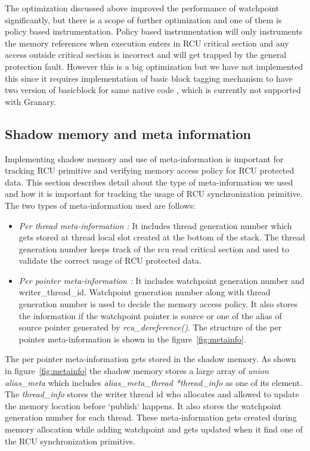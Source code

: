 The optimization discussed above improved the performance of watchpoint significantly, but there is a scope of further optimization and one of them is policy based instrumentation. Policy based instrumentation will only instruments the memory references when execution enters in RCU critical section and any access outside critical section is incorrect and will get trapped by the general protection fault. However this is a big optimization but we have not implemented this since it requires implementation of basic block tagging mechanism to have two version of basicblock for same native code , which is currently not supported with Granary.


\subsection{Shadow memory and meta information}
Implementing shadow memory and use of meta-information is important for tracking RCU primitive and verifying memory access policy for RCU protected data. This section describes detail about the type of meta-information we used and how it is important for tracking the usage of RCU synchronization primitive. The two types of meta-information used are follows: 
\begin{itemize}
 	\item \emph{Per thread meta-information :} It includes thread generation number which gets stored at thread local slot created at the bottom of the stack. The thread generation number keeps track of the rcu read critical section and used to validate the correct usage of RCU protected data.
   	\item \emph{Per pointer meta-information :} It includes watchpoint generation number and writer\_thread\_id.  Watchpoint generation number along with thread generation number is used to decide the memory access policy. It also stores the information if the watchpoint pointer is source or one of the alias of source pointer generated by \emph{rcu\_dereference()}. The structure of the per pointer meta-information is shown in the figure~\ref{fig:metainfo}. 
\end{itemize} 

The per pointer meta-information gets stored in the shadow memory. As shown in figure~\ref{fig:metainfo} the shadow memory stores a large array of \emph{union alias\_meta} which includes \emph{ alias\_meta\_thread *thread\_info} as one of its element. The \emph{thread\_info} stores the writer thread id who allocates and allowed to update the memory location before `publish` happens. It also stores the watchpoint generation number for each thread. These meta-information gets created during memory allocation while adding watchpoint and gets updated when it find one of the RCU synchronization primitive. 

